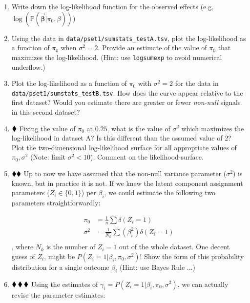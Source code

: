 \documentclass{pset}
\begin{document}
\begin{enumerate}
\item Write down the log-likelihood function for the observed effects (e.g. $\log (\mathbb{P}(\overrightarrow{\mathbf{\beta}} | \pi_0, \beta))$)
\item Using the data in \texttt{data/pset1/sumstats\_testA.tsv}, plot the log-likelihood as a function of $\pi_0$ when $\sigma^2 = 2$. Provide an estimate of the value of $\pi_0$ that maximizes the log-likelihood. (Hint: use \texttt{logsumexp} to avoid numerical underflow.)
\item Plot the log-likelihood as a function of $\pi_0$ with $\sigma^2 = 2$ for the data in \texttt{data/pset1/sumstats\_testB.tsv}. How does the curve appear relative to the first dataset? Would you estimate there are greater or fewer \textit{non-null} signals in this second dataset?
\item $\mathbin{\blacklozenge}$ Fixing the value of $\pi_0$ at $0.25$, what is the value of $\sigma^2$ which maximizes the log-likelihood in dataset A? Is this different than the assumed value of $2$? Plot the two-dimensional log-likelihood surface for all appropriate values of $\pi_0, \sigma^2$ (Note: limit $\sigma^2 < 10$). Comment on the likelihood-surface.
\item $\mathbin{\blacklozenge}\mathbin{\blacklozenge}$ Up to now we have assumed that the non-null variance parameter ($\sigma^2$) is known, but in practice it is not. If we knew the latent component assignment parameters ($Z_i \in \{0, 1\}$) per $\beta_i$, we could estimate the following two parameters straightforwardly: 

$$
\begin{aligned}
\pi_0 &= \frac{1}{n}\sum \delta(Z_i = 1)\\
\sigma^2 &= \frac{1}{N_k} \sum (\beta_i^2)\delta(Z_i = 1)\\
\end{aligned}
$$
, where $N_k$ is the number of $Z_i = 1$ out of the whole dataset. One decent guess of $Z_i$, might be $P(Z_i = 1 | \beta_i, \pi_0, \sigma^2)$! Show the form of this probability distribution for a single outcome $\beta_i$ (Hint: use Bayes Rule ...)

\item $\mathbin{\blacklozenge}\mathbin{\blacklozenge}\mathbin{\blacklozenge}$ Using the estimates of $\gamma_i = P(Z_i = 1 | \beta_i, \pi_0, \sigma^2)$, we can actually revise the parameter estimates: 


\end{enumerate}
\end{document}
